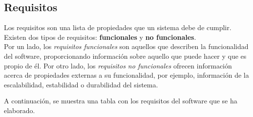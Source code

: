 \documentclass[../main.tex]{subfiles}
\begin{document}
\subsection{Requisitos}
Los requisitos son una lista de propiedades que un sistema debe de cumplir. Existen dos tipos de requisitos: \textbf{funcionales} y \textbf{no funcionales}.\\

Por un lado, los \textit{requisitos funcionales} son aquellos que describen la funcionalidad del software, proporcionando información sobre aquello que puede hacer y que es propio de él. Por otro lado, los \textit{requisitos no funcionales} ofrecen información acerca de propiedades externas a su funcionalidad, por ejemplo, información de la escalabilidad, estabilidad o durabilidad del sistema.

A continuación, se muestra una tabla con los requisitos del software que se ha elaborado.
\end{document}

